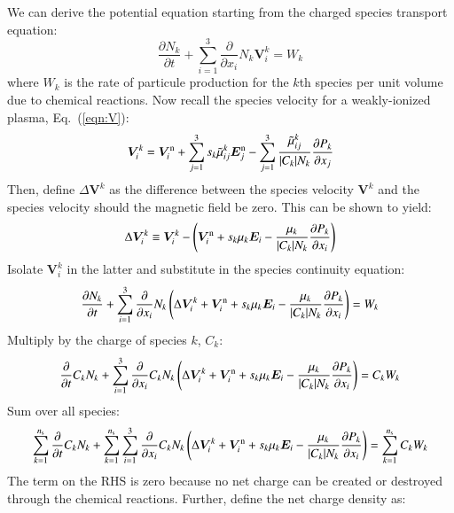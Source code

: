 \documentclass{warpdoc}
\newcommand{\ns}{{n_{\rm s}}}
\newcommand{\nd}{3}
\renewcommand{\vec}[1]{\bm{#1}}
\begin{document}
We can derive the potential equation starting from the charged species transport equation:
%
\begin{equation}
  \frac{\partial N_k}{\partial t} + \sum_{i=1}^3 \frac{\partial}{\partial x_i} N_k \vec{V}_i^k = W_k
\end{equation}
%
where $W_k$ is the rate of particule production for the $k$th species per unit volume due to chemical reactions. Now recall the species velocity for a weakly-ionized plasma, Eq.\ (\ref{eqn:V}):
%
\begin{equation}
  \vec{V}^{k}_i = \vec{V}^{\rm n}_i+\sum_{j=1}^\nd s_k \wtilde{\mu}^k_{ij}  \vec{E}_j^{\rm n}
             - \sum_{j=1}^\nd  \frac{\wtilde{\mu}^{k}_{ij}}{|C_k| N_k} \frac{\partial P_k}{\partial x_j}
\end{equation}
%
Then, define $\Delta \vec{V}^k$ as the difference between the species velocity $\vec{V}^k$ and the species velocity should the magnetic field be zero. This can be shown to yield:
%
\begin{equation}
\Delta \vec{V}^k_i \equiv \vec{V}^k_i - \left(\vec{V}^{\rm n}_i+ s_k \mu_k  \vec{E}_i
             -   \frac{\mu_k}{|C_k| N_k} \frac{\partial P_k}{\partial x_i}\right)
\label{eqn:deltaV}
\end{equation}
%
Isolate $\vec{V}_i^k$ in the latter and substitute in the species continuity equation:
%
\begin{equation}
  \frac{\partial N_k}{\partial t} + \sum_{i=1}^3 \frac{\partial}{\partial x_i} N_k \left(\Delta \vec{V}^k_i+\vec{V}^{\rm n}_i+ s_k \mu_k  \vec{E}_i  -   \frac{\mu_k}{|C_k| N_k} \frac{\partial P_k}{\partial x_i} \right) = W_k
\end{equation}
%
Multiply by the charge of species $k$, $C_k$:
%
\begin{equation}
  \frac{\partial }{\partial t}C_k N_k + \sum_{i=1}^3 \frac{\partial}{\partial x_i} C_k N_k \left(\Delta \vec{V}^k_i+\vec{V}^{\rm n}_i+ s_k \mu_k  \vec{E}_i  -   \frac{\mu_k}{|C_k| N_k} \frac{\partial P_k}{\partial x_i} \right) = C_k W_k
\end{equation}
%
Sum over all species:
%
\begin{equation}
 \sum_{k=1}^\ns \frac{\partial }{\partial t}C_k N_k + \sum_{k=1}^\ns\sum_{i=1}^3 \frac{\partial}{\partial x_i} C_k N_k \left(\Delta \vec{V}^k_i+\vec{V}^{\rm n}_i+ s_k \mu_k  \vec{E}_i  -   \frac{\mu_k}{|C_k| N_k} \frac{\partial P_k}{\partial x_i} \right) = \sum_{k=1}^\ns C_k W_k
\end{equation}
%
The term on the RHS is zero because no net charge can be created or destroyed through the chemical reactions. Further, define the net charge density as:
\end{document}
